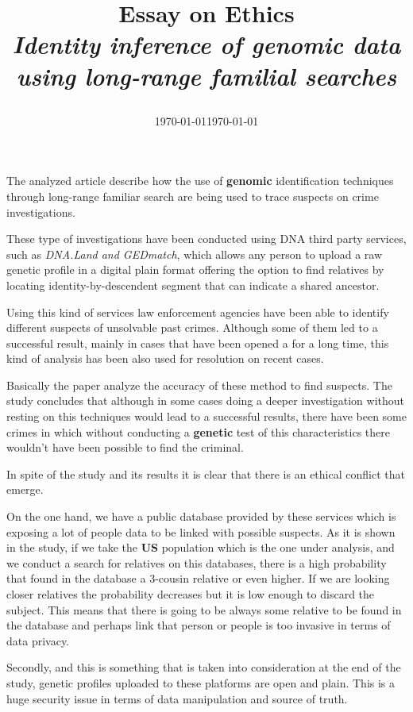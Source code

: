 \documentclass[12pt, a4paper]{article}
\title{
  Essay on Ethics\\
  \large{\textit{Identity inference of genomic data using long-range familial searches}}\\
  \date\today\vspace{-2em}}
\date{\normalize\today}
\begin{document}
\maketitle

The analyzed article describe how the use of \textbf{genomic} identification
techniques through long-range familiar search are being used to trace suspects
on crime investigations.

These type of investigations have been conducted using DNA third party services,
such as \textit{DNA.Land and GEDmatch}, which allows any person to upload a raw
genetic profile in a digital plain format offering the option to find relatives
by locating identity-by-descendent segment that can indicate a shared ancestor.

Using this kind of services law enforcement agencies have been able to identify
different suspects of unsolvable past crimes. Although some of them
led to a successful result, mainly in cases that have been opened a for a long
time, this kind of analysis has been also used for resolution on recent cases.

Basically the paper analyze the accuracy of these method to find suspects. The
study concludes that although in some cases doing a deeper investigation without
resting on this techniques would lead to a successful results, there have been
some crimes in which without conducting a \textbf{genetic} test of this
characteristics there wouldn't have been possible to find the criminal.

In spite of the study and its results it is clear that there is an ethical
conflict that emerge.

On the one hand, we have a public database provided by these services which is
exposing a lot of people data to be linked with possible suspects. As it is shown in
the study, if we take the \textbf{US} population which is the one under
analysis, and we conduct a search for relatives on this databases, there is a
high probability that found in the database a 3-cousin relative or even higher. If we are looking
closer relatives the probability decreases but it is low enough to discard the
subject. This means that there is going to be always some relative to be found
in the database and perhaps link that person or people is too invasive in terms
of data privacy.

Secondly, and this is something that is taken into consideration at the end of
the study, genetic profiles uploaded to these platforms are open and plain. This
is a huge security issue in terms of data manipulation and source of truth.
\end{document}
